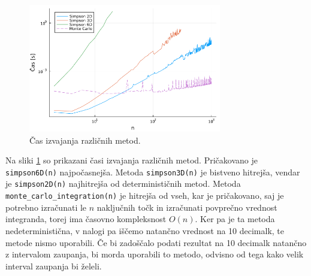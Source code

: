 \documentclass[11pt, titlepage]{article}
\begin{document}
\begin{figure}[H]
    \centering
    \includegraphics[width=0.75\textwidth]{figures/force_time.png}
    \caption{Čas izvajanja različnih metod.}
    \label{fig:time}
\end{figure}

Na sliki \ref{fig:time} so prikazani časi izvajanja različnih metod. Pričakovano je \texttt{simpson6D(n)} najpočasnejša. Metoda \texttt{simpson3D(n)} je bistveno hitrejša, vendar je \texttt{simpson2D(n)} najhitrejša od determinističnih metod. Metoda \texttt{monte\_carlo\_integration(n)} je hitrejša od vseh, kar je pričakovano, saj je potrebno izračunati le $n$ naključnih točk in izračunati povprečno vrednost integranda, torej ima časovno kompleksnost $O(n)$.
Ker pa je ta metoda nedeterministična, v nalogi pa iščemo natančno vrednost na 10 decimalk, te metode nismo uporabili. Če bi zadoščalo podati rezultat na 10 decimalk natančno z intervalom zaupanja, bi morda uporabili to metodo, odvisno od tega kako velik interval zaupanja bi želeli.


\end{document}
